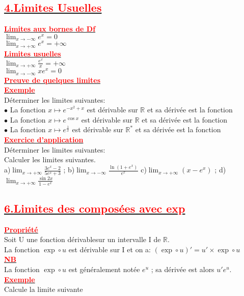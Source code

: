 \documentclass[12pt]{article}
\begin{document}
\subsection*{\underline{\textbf{\textcolor{red}{4.Limites Usuelles}}}}
\underline{\textbf{\textcolor{red}{Limites aux bornes de Df }}}\\
$\lim_{x \to -\infty}e^{x}=0$\\
$\lim_{x \to +\infty}e^{x}=+\infty$\\
\underline{\textbf{\textcolor{red}{Limites usuelles}}}\\
$\lim_{x \to +\infty}\frac{e^{x}}{x}=+\infty$\\
$\lim_{x \to -\infty}xe^{x}=0$\\
\underline{\textbf{\textcolor{red}{Preuve de quelques limites}}}\\

\underline{\textbf{\textcolor{red}{Exemple}}}\\
Déterminer les limites suivantes:\\
$\bullet$ La fonction $x \longmapsto e^{-x^{2}+x}$ est dérivable sur $\mathbb{R}$ et sa dérivée est la fonction\\
$\bullet$ La fonction $x \longmapsto e^{\cos x}$ est dérivable sur $\mathbb{R}$ et sa dérivée est  la fonction\\
$\bullet$ La fonction $x \longmapsto e^{\frac{1}{x}}$ est dérivable sur $\mathbb{R}^{*}$ et sa dérivée est  la fonction\\
\underline{\textbf{\textcolor{red}{Exercice d'application}}}\\
Déterminer les limites suivantes:\\
Calculer les limites suivantes.\\
a)\(\lim_{x \to +\infty}\frac{3e^{x}-2}{5e^{x}+3}\) ; b)\(\lim_{x \to -\infty}\frac{\ln(1+e^{x})}{e^{x}}\)
c)\( \lim_{x \to +\infty }(x-e^{x})\) ; d)\( \lim_{x \to +\infty }\frac{\sin2x}{1-e^{x}}\)
\subsection*{\underline{\textbf{\textcolor{red}{6.Limites des composées avec exp}}}}
\underline{\textbf{\textcolor{red}{Propriété}}}\\
Soit U une fonction dérivablesur un intervalle I de $\mathbb{R}$.\\
La fonction $\exp\circ u $ est dérivable sur I  et on a: $(\exp\circ u )'=u' \times \exp\circ u$\\
\underline{\textbf{\textcolor{red}{NB}}}\\
La fonction $\exp\circ u $ est généralement notée $e^{u}$ ; sa dérivée est alors $u'e^{u}$.\\
\underline{\textbf{\textcolor{red}{Exemple}}}\\
Calcule la limite suivante\\
\end{document}
